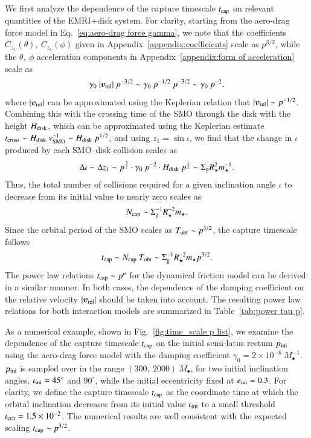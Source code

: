 \documentclass[aps,prx,reprint,superscriptaddress,nofootinbib,longbibliography]{revtex4-1}
\begin{document}
We first analyze the dependence of the capture timescale $t_{\rm cap}$ on relevant quantities of the EMRI+disk system.
For clarity, starting from the aero-drag force model in Eq.~\eqref{eq:aero-drag force gamma}, we note that the coefficients $C_{z_1}(\theta),\ C_{z_{1}}(\phi)$ given in Appendix~\ref{appendix:coefficients} scale as $p^{3/2}$, while the $\theta,\ \phi$ acceleration components in Appendix~\ref{appendix:form of acceleration} scale as
\begin{equation}
    \gamma_{0}\ \abs{\boldsymbol{v}_{\rm rel}}\ p^{-3/2}\sim \gamma_{0}\ p^{-1/2}\ p^{-3/2}\sim \gamma_{0}\ p^{-2},
\end{equation}
 where $\abs{\boldsymbol{v}_{\rm rel}}$ can be approximated using the Keplerian relation that $\abs{\boldsymbol{v}_{\rm rel}}\sim p^{-1/2}$. Combining this with the crossing time of the SMO through the disk with the height $H_{\rm disk}$, which can be approximated using the Keplerian estimate $t_{\rm cross}\sim H_{\rm disk}\ v_{\rm SMO}^{-1}\sim H_{\rm disk}\ p^{1/2}$, and using $z_{1}=\sin\iota$, we find that the change in $\iota$ produced by each SMO–disk collision scales as
\begin{equation}
    \Delta\iota\sim\Delta z_{1}\sim p^{\frac{3}{2}}\cdot \gamma_{0}\ p^{-2}\cdot H_{\rm disk}\ p^{\frac{1}{2}}\sim \Sigma_{\rm g}R_{\star}^2m_{\star}^{-1}.
\end{equation}
Thus, the total number of collisions required for a given inclination angle $\iota$ to decrease from its initial value to nearly zero scales as
\begin{equation}
    N_{\rm cap}\sim \Sigma_{\rm g}^{-1}R_{\star}^{-2}m_{\star}.
\end{equation}
Since the orbital period of the SMO scales as $T_{\rm obt}\sim p^{3/2}$,  the capture timescale follows
\begin{equation}
    t_{\rm cap}\sim N_{\rm cap}\ T_{\rm obt}\sim \Sigma_{\rm g}^{-1}R_{\star}^{-2}m_{\star} p^{3/2}.
\end{equation}
The power law relations $t_{\rm cap}\sim p^{n}$ for the dynamical friction model can be derived in a similar manner. In both cases, the dependence of the damping coefficient on the relative velocity $\abs{\boldsymbol{v}_{\rm rel}}$ should be taken into account. The resulting power law relations for both interaction models are summarized in Table~\ref{tab:power tau p}.\par
As a numerical example, shown in Fig.~\ref{fig:time_scale p list}, we examine the dependence of the capture timescale $t_{\rm cap}$ on the initial semi-latus rectum $p_{\rm ini}$ using the aero-drag force model with the damping coefficient $\gamma_{0}=2\times 10^{-6}\ M_{\bullet}^{-1}$. $p_{\rm ini}$ is sampled over in the range $(300,\ 2000)\ M_{\bullet}$, for two initial inclination angles, $\iota_{\rm ini}=45^{\circ}$ and $90^{\circ}$, while the initial eccentricity fixed at $e_{\rm ini}=0.3$. For clarity, we define the capture timescale $t_{\rm cap}$ as the coordinate time at which the orbital inclination decreases from its initial value $\iota_{\rm ini}$ to a small threshold $\iota_{\rm crit}=1.5\times10^{-2}$.
The numerical results are well consistent with the expected scaling  $t_{\rm cap}\sim p^{3/2}$. 
\end{document}
